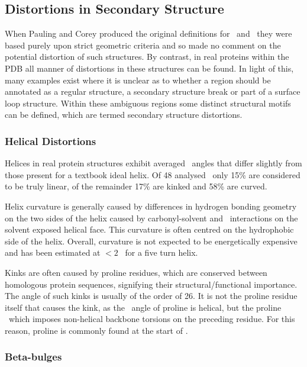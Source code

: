\subsection{Distortions in Secondary Structure }

When Pauling and Corey produced the original definitions for \ahelixs\ and \bsheets\, they were based purely upon strict geometric criteria and so made no comment
on the potential distortion of such structures. By contrast, in real proteins within the PDB
all manner of distortions in these structures can be found.  In light of
this, many examples exist where it is unclear as to whether a region should
be annotated as a regular structure, a secondary structure break or part of a surface loop structure. Within these ambiguous regions some distinct structural
motifs can be defined, which are termed secondary structure distortions.

 
\subsubsection{Helical Distortions}

Helices in real protein structures exhibit averaged \phipsi\ angles that differ slightly from those present for a textbook ideal helix. 
Of 48 analysed \ahelixs\, only 15\% are considered to be truly linear, of the remainder 17\% are kinked and 58\% are curved\cite{AUTO:HelixKinks}.

Helix curvature is generally caused by differences in hydrogen bonding geometry
on the two sides of the helix caused by carbonyl-solvent and \sidechain\ interactions on the solvent exposed helical face. This  curvature is often centred on the hydrophobic side of the helix. Overall, curvature is not expected to be energetically expensive and has been estimated at 
$<2$ \kcalmol\ for a five turn helix.

Kinks are often caused by proline residues, which are  conserved
 between homologous protein sequences, signifying their structural/functional importance. The angle of such kinks is usually of the order of 26\degree.
It is not the proline residue itself that causes the kink, as the \phipsi\
angle of proline is helical, but the  proline \sidechain\ which imposes
non-helical backbone torsions on the preceding residue. For this reason,
proline is commonly found at the start of \ahelixs.


\subsubsection{Beta-bulges} 

